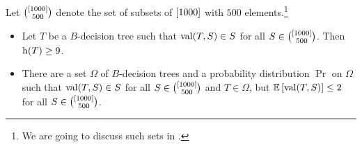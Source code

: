 \begin{theorem}
\label{theorem:guess-one-out-of-many}
  Let $\binom{{[{1000}]}}{500}$ denote the set of subsets of ${[{1000}]}$
  with $500$ elements.\footnote{%
    We are going to discuss such sets in .
  }
  \begin{itemize}
    \item Let $T$ be a $B$-decision tree such that $\mathrm{val}({T}, {S}) \in S$
      for all $S \in \binom{{[{1000}]}}{500}$. Then $\DTHeight{T} \ge 9$.
    \item There are a set $\Omega$ of $B$-decision trees and a probability
      distribution $\Pr$ on $\Omega$ such that $\mathrm{val}({T}, {S}) \in S$ for
      all $S \in \binom{{[{1000}]}}{500}$ and $T \in \Omega$, but
      $\mathbb{E}\left[\mathrm{val}({T}, {S})\right] \le 2$ for all 
      $S \in \binom{{[{1000}]}}{500}$.
  \end{itemize}
\end{theorem}
